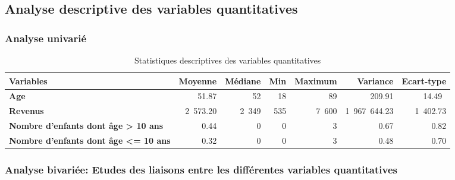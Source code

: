 \documentclass[11pt,a4paper, x11names]{article}\usepackage[]{graphicx}\usepackage[]{color}
\begin{document}
\subsection{Analyse descriptive des variables quantitatives }
\subsubsection{Analyse univarié}

\begin{table}[!h] \centering
\begin{small}
\begin{tabular}{@{}lrrrrrr@{}}\toprule
\textbf{Variables}& \textbf{Moyenne}& \textbf{Médiane}& \textbf{Min} & \textbf{Maximum} & \textbf{Variance} & \textbf{Ecart-type} \\ \midrule
\textbf{Age}          & 51.87 &  52 & 18 & 89 & 209.91 & 14.49\ \\ \hdashline
\textbf{Revenus}      & 2~573.20 & 2~349 & 535&7~600 & 1~967~644.23&1~402.73 \\ \hdashline
\textbf{Nombre d'enfants dont âge > 10 ans} &  0.44 & 0 & 0 & 3 & 0.67 & 0.82 \\  \hdashline

\textbf{Nombre d'enfants dont âge <= 10 ans} &  0.32 & 0 & 0 & 3 & 0.48 & 0.70 \\  
\bottomrule
\end{tabular}
\end{small}
\caption{Statistiques descriptives des variables quantitatives}
\end{table}



\subsubsection{Analyse bivariée: Etudes des liaisons entre les différentes variables quantitatives}
\end{document}
